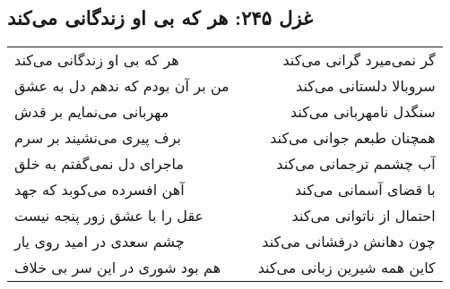 \begin{center}
\section*{غزل ۲۴۵: هر که بی او زندگانی می‌کند}
\label{sec:245}
\begin{longtable}{l p{0.5cm} r}
هر که بی او زندگانی می‌کند
&&
گر نمی‌میرد گرانی می‌کند
\\
من بر آن بودم که ندهم دل به عشق
&&
سروبالا دلستانی می‌کند
\\
مهربانی می‌نمایم بر قدش
&&
سنگدل نامهربانی می‌کند
\\
برف پیری می‌نشیند بر سرم
&&
همچنان طبعم جوانی می‌کند
\\
ماجرای دل نمی‌گفتم به خلق
&&
آب چشمم ترجمانی می‌کند
\\
آهن افسرده می‌کوبد که جهد
&&
با قضای آسمانی می‌کند
\\
عقل را با عشق زور پنجه نیست
&&
احتمال از ناتوانی می‌کند
\\
چشم سعدی در امید روی یار
&&
چون دهانش درفشانی می‌کند
\\
هم بود شوری در این سر بی خلاف
&&
کاین همه شیرین زبانی می‌کند
\\
\end{longtable}
\end{center}
